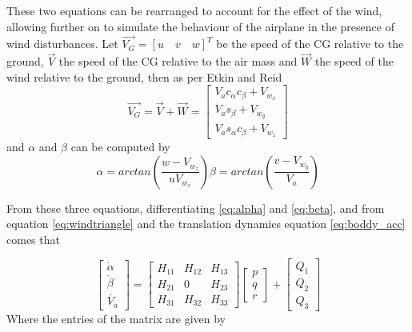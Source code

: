 These two equations can be rearranged to account for the effect of the wind, allowing further on to simulate the behaviour of the airplane in the presence of wind disturbances. Let $\vec{V_G} = [u \quad v \quad w]^T$ be the speed of the CG relative to the ground, $\vec{V}$ the speed of the CG relative to the air mass and $\vec{W}$ the speed of the wind relative to the ground, then as per Etkin and Reid \cite{Etkin+Reid} 
\begin{equation}
\vec{V_G} = \vec{V} + \vec{W} = 
\begin{bmatrix}
V_ac_\alpha c_\beta + V_{w_x}\\
V_as_\beta+V_{w_y}\\
V_as_\alpha c_\beta + V_{w_z}
\end{bmatrix}
\label{eq:windtriangle}
\end{equation}
and $\alpha$ and $\beta$ can be computed by 
\begin{subequations}
	\begin{equation}
		\alpha = arctan\left(\dfrac{w-V_{w_z}}{uV_{w_x}}\right)
		\label{eq:alpha}
	\end{equation}
	\begin{equation}
		\beta = arctan\left(\dfrac{v-V_{w_y}}{V_a}\right)
		\label{eq:beta}
	\end{equation}
\end{subequations}

From these three equations, differentiating \ref{eq:alpha} and \ref{eq:beta}, and from equation \ref{eq:windtriangle} and the translation dynamics equation \ref{eq:boddy_acc} comes that 

\begin{equation}
\begin{bmatrix}
\dot{\alpha}\\
\dot{\beta}\\
\dot{V_a}
\end{bmatrix}
= 
\begin{bmatrix}
H_{11} & H_{12} & H_{13}\\
H_{21} & 0 & H_{23}\\
H_{31} & H_{32} & H_{33}
\end{bmatrix}
\begin{bmatrix}
p\\
q\\
r
\end{bmatrix}
+
\begin{bmatrix}
Q_1\\
Q_2\\
Q_3
\end{bmatrix}
\label{eq:alphabetadot}
\end{equation}
Where the entries of the matrix are given by

